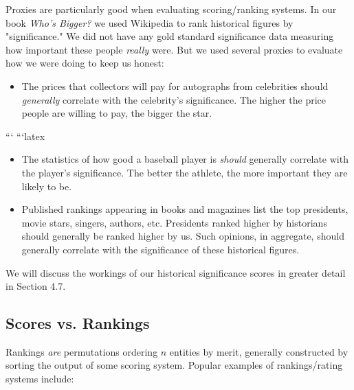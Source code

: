 \documentclass[10pt]{article}
\begin{document}
Proxies are particularly good when evaluating scoring/ranking systems. In our book \textit{Who's Bigger?} \cite{SW13} we used Wikipedia to rank historical figures by "significance." We did not have any gold standard significance data measuring how important these people \textit{really} were. But we used several proxies to evaluate how we were doing to keep us honest:

\begin{itemize}
  \item The prices that collectors will pay for autographs from celebrities should \textit{generally} correlate with the celebrity's significance. The higher the price people are willing to pay, the bigger the star.
\end{itemize}



```
```latex
\begin{itemize}
    \item The statistics of how good a baseball player is \textit{should} generally correlate with the player's significance. The better the athlete, the more important they are likely to be.
    \item Published rankings appearing in books and magazines list the top presidents, movie stars, singers, authors, etc. Presidents ranked higher by historians should generally be ranked higher by us. Such opinions, in aggregate, should generally correlate with the significance of these historical figures.
\end{itemize}

We will discuss the workings of our historical significance scores in greater detail in Section 4.7.

\subsection{Scores vs. Rankings}
Rankings \textit{are} permutations ordering $n$ entities by merit, generally constructed by sorting the output of some scoring system. Popular examples of rankings/rating systems include:
\end{document}
